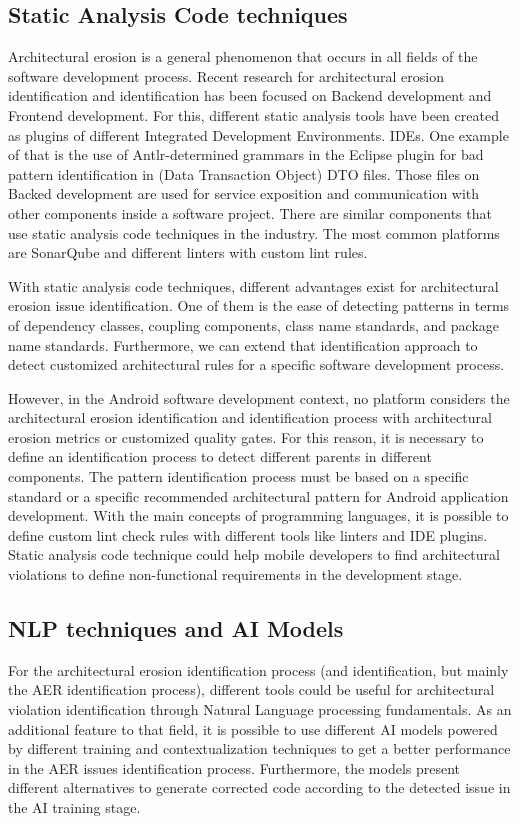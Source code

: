 \subsection{Static Analysis Code techniques}
Architectural erosion is a general phenomenon that occurs in all fields of the software development process. Recent research for architectural erosion identification and identification has been focused on Backend development and Frontend development. For this, different static analysis tools have been created as plugins of different Integrated Development Environments. IDEs. One example of that is the use of Antlr-determined grammars in the Eclipse plugin for bad pattern identification in (Data Transaction Object) DTO files. Those files on Backed development are used for service exposition and communication with other components inside a software project.
There are similar components that use static analysis code techniques in the industry. The most common platforms are SonarQube and different linters with custom lint rules.

With static analysis code techniques, different advantages exist for architectural erosion issue identification. One of them is the ease of detecting patterns in terms of dependency classes, coupling components, class name standards, and package name standards. Furthermore, we can extend that identification approach to detect customized architectural rules for a specific software development process. \cite{master-thesis-aer-backend}

However, in the Android software development context, no platform considers the architectural erosion identification and identification process with architectural erosion metrics or customized quality gates. For this reason, it is necessary to define an identification process to detect different parents in different components. The pattern identification process must be based on a specific standard or a specific recommended architectural pattern for Android application development. With the main concepts of programming languages, it is possible to define custom lint check rules with different tools like linters and IDE plugins. Static analysis code technique could help mobile developers to find architectural violations to define non-functional requirements in the development stage.


\subsection{NLP techniques and AI Models}
For the architectural erosion identification process (and identification, but mainly the AER identification process), different tools could be useful for architectural violation identification through Natural Language processing fundamentals. As an additional feature to that field, it is possible to use different AI models powered by different training and contextualization techniques to get a better performance in the AER issues identification process. Furthermore, the models present different alternatives to generate corrected code according to the detected issue in the AI training stage.

